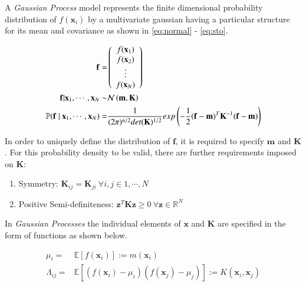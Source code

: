 \documentclass{article}
\begin{document}
A \emph{Gaussian Process} model represents the finite dimensional probability distribution of $f(\mathbf{x}_i)$ by a multivariate gaussian having a particular structure for its mean and covariance as shown in \ref{eq:normal} - \ref{eq:sto}.

\begin{align}
 \mathbf{f} = & \left( \begin{array}{c} f(\mathbf{x}_1) \\ f(\mathbf{x}_2) \\ \vdots \\ f(\mathbf{x}_N) \end{array} \right) \label{eq:fvalues}\\
 \vspace{2\baselineskip}
 \mathbf{f} | \mathbf{x}_1, \cdots, \mathbf{x}_N \sim & \mathcal{N}\left( \mathbf{m}, \mathbf{K} \right)  \label{eq:normal}\\
 \vspace{2\baselineskip}
 \mathbb{P}( \mathbf{f} \ | \ \mathbf{x}_1, \cdots, \mathbf{x}_N) = & \frac{1}{(2\pi)^{n/2} det(\mathbf{K})^{1/2}} exp \left(-\frac{1}{2} (\mathbf{f} - \mathbf{m})^T \mathbf{K}^{-1} (\mathbf{f} - \mathbf{m}) \right) \label{eq:sto}
\end{align}

In order to uniquely define the distribution of $\mathbf{f}$, it is required to specify $\mathbf{m}$ and $\mathbf{K}$. For this probability density to be valid, there are further requirements imposed on $\mathbf{K}$: 

\begin{enumerate}
      \item Symmetry: $\mathbf{K}_{ij} = \mathbf{K}_{ji} \ \forall i,j \in {1, \cdots, N} $ 
      \item Positive Semi-definiteness: $\mathbf{z}^T \mathbf{K} \mathbf{z} \geq 0 \ \forall \mathbf{z} \in \mathbb{R}^N$  
\end{enumerate}

In \emph{Gaussian Processes} the individual elements of $\mathbf{x}$ and $\mathbf{K}$ are specified in the form of functions as shown below.

\begin{align}
      \mu_i = & \mathbb{E}[f(\mathbf{x}_i)] := m(\mathbf{x}_i) \\
      \Lambda_{ij} = & \mathbb{E}[(f(\mathbf{x}_i) - \mu_i)(f(\mathbf{x}_j) - \mu_j)] := K(\mathbf{x}_i, \mathbf{x}_j)
\end{align}
\end{document}
